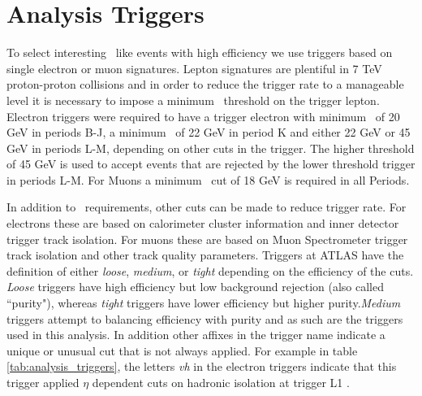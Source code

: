 \section{Analysis Triggers}
\label{sec:analysis_trigger}

To select interesting \ttbar\ like events with high efficiency we use triggers based on single electron or muon signatures. Lepton signatures are plentiful in 7 TeV proton-proton collisions and in order to reduce the trigger rate to a manageable level it is necessary to impose a minimum \pt\ threshold on the trigger lepton. Electron triggers were required to have a trigger electron with minimum \pt\ of 20 GeV in periods B-J, a minimum \pt\ of 22 GeV in period K and either 22 GeV or 45 GeV in periods L-M, depending on other cuts in the trigger. The higher threshold of 45 GeV is used to accept events that are rejected by the lower threshold trigger in periods L-M. For Muons a minimum \pt\ cut of 18 GeV is required in all Periods.

In addition to \pt\ requirements, other cuts can be made to reduce trigger rate. For electrons these are based on calorimeter cluster information and inner detector trigger track isolation. For muons these are based on Muon Spectrometer trigger track isolation and other track quality parameters. Triggers at ATLAS have the definition of either \emph{loose}, \emph{medium}, or \emph{tight} depending on the efficiency of the cuts. \emph{Loose} triggers have high efficiency but low background rejection (also called ``purity"), whereas \emph{tight} triggers have lower efficiency but higher purity.\emph{Medium} triggers attempt to balancing efficiency with purity and as such are the triggers used in this analysis. In addition other affixes in the trigger name indicate a unique or unusual cut that is not always applied. For example in table \ref{tab:analysis_triggers}, the letters \emph{vh} in the electron triggers indicate that this trigger applied $\eta$ dependent cuts on hadronic isolation at trigger L1 \cite{LeptonTrigger}.

